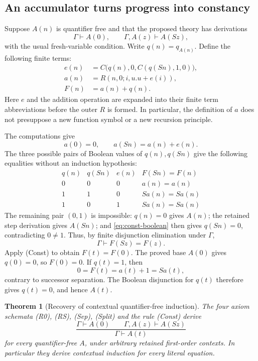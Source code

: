 \documentclass[11pt]{article}
\newtheorem{theorem}{Theorem}[section]
\theoremstyle{definition}\newtheorem{definition}[theorem]{Definition}
\begin{document}
\subsection{An accumulator turns progress into constancy}

Suppose $A(n)$ is quantifier free and that the proposed theory has
derivations
\[
 \Gamma\vdash A(0),\qquad
 \Gamma,A(z)\vdash A(Sz),
\]
with the usual fresh-variable condition.  Write $q(n)=q_{A(n)}$.
Define the following finite terms:
\begin{align*}
 e(n)&=C\bigl(q(n),0,C(q(Sn),1,0)\bigr),\\
 a(n)&=R(n,0;i,u.u+e(i)),\\
 F(n)&=a(n)+q(n).
\end{align*}
Here $e$ and the addition operation are expanded into their finite term
abbreviations before the outer $R$ is formed.  In particular, the
definition of $a$ does not presuppose a new function symbol or a new
recursion principle.

The computations give
\[
 a(0)=0,\qquad a(Sn)=a(n)+e(n).
\]
The three possible pairs of Boolean values of $q(n),q(Sn)$ give the
following equalities without an induction hypothesis:
\[
\begin{array}{c|c|c|c}
 q(n)&q(Sn)&e(n)&F(Sn)=F(n)\\ \hline
 0&0&0&a(n)=a(n)\\
 1&1&0&Sa(n)=Sa(n)\\
 1&0&1&Sa(n)=Sa(n)
\end{array}
\]
The remaining pair $(0,1)$ is impossible: $q(n)=0$ gives $A(n)$;
the retained step derivation gives $A(Sn)$; and
\eqref{eq:const-boolean} then gives $q(Sn)=0$, contradicting $0\ne1$.
Thus, by finite disjunction elimination under $\Gamma$,
\[
                       \Gamma\vdash F(Sz)=F(z).
\]
Apply \textup{(Const)} to obtain $F(t)=F(0)$.  The proved base $A(0)$
gives $q(0)=0$, so $F(0)=0$.  If $q(t)=1$, then
\[
                 0=F(t)=a(t)+1=Sa(t),
\]
contrary to successor separation.  The Boolean disjunction for $q(t)$
therefore gives $q(t)=0$, and hence $A(t)$.

\begin{theorem}[Recovery of contextual quantifier-free induction]
The four axiom schemata \textup{(R0)}, \textup{(RS)}, \textup{(Sep)},
\textup{(Split)} and the rule \textup{(Const)} derive
\[
 \frac{\Gamma\vdash A(0)\qquad\Gamma,A(z)\vdash A(Sz)}
      {\Gamma\vdash A(t)}
\]
for every quantifier-free $A$, under arbitrary retained first-order
contexts.  In particular they derive contextual induction for every
literal equation.
\end{theorem}
\end{document}
